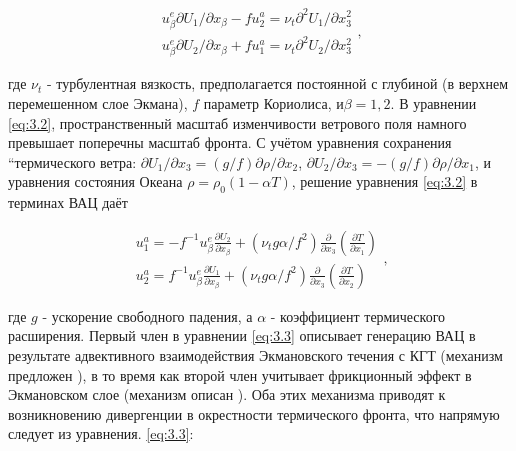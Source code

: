 {\begin{equation} \label{eq:3.2} \begin{array}{l} {u_{\beta }^{e} \partial U_{1} /\partial x_{\beta } -fu_{2}^{a} =\nu _{t} \partial ^{2} U_{1} /\partial x_{3}^{2} } \\ {u_{\beta }^{e} \partial U_{2} /\partial x_{\beta } +fu_{1}^{a} =\nu _{t} \partial ^{2} U_{2} /\partial x_{3}^{2} } \end{array},  \end{equation} 



\noindent где $\nu _{t} $ - турбулентная вязкость, предполагается постоянной с глубиной (в верхнем перемешенном слое Экмана), $f$ параметр Кориолиса, и$\beta =1,2$. В уравнении \eqref{eq:3.2}, пространственный масштаб изменчивости ветрового поля намного превышает поперечны масштаб фронта. С учётом уравнения сохранения ``термического ветра: $\partial U_{1} /\partial x_{3} =(g/f)\partial \rho /\partial x_{2} $, $\partial U_{2} /\partial x_{3} =-(g/f)\partial \rho /\partial x_{1} $, и уравнения состояния Океана $\rho =\rho _{0} (1-\alpha T)$, решение уравнения \eqref{eq:3.2} в терминах ВАЦ даёт



\begin{equation} \label{eq:3.3} \begin{array}{l} {u_{1}^{a} =-f^{-1} u_{\beta }^{e} \frac{\partial U_{2} }{\partial x_{\beta } } +(\nu _{t} g\alpha /f^{2} )\frac{\partial }{\partial x_{3} } \left(\frac{\partial T}{\partial x_{1}^{} } \right)} \\ {u_{2}^{a} =f^{-1} u_{\beta }^{e} \frac{\partial U_{1} }{\partial x_{\beta } } +(\nu _{t} g\alpha /f^{2} )\frac{\partial }{\partial x_{3} } \left(\frac{\partial T}{\partial x_{2}^{} } \right)} \end{array},  \end{equation} 



\noindent где $g$ - ускорение свободного падения, а $\alpha $ - коэффициент термического расширения. Первый член в уравнении \eqref{eq:3.3} описывает генерацию ВАЦ в результате адвективного взаимодействия Экмановского течения с КГТ (механизм предложен \citep{Klein1990}), в то время как второй член учитывает фрикционный эффект в Экмановском слое (механизм описан \citep{Garrett1981}). Оба этих механизма приводят к возникновению дивергенции в окрестности термического фронта, что напрямую следует из уравнения. \eqref{eq:3.3}:



}
